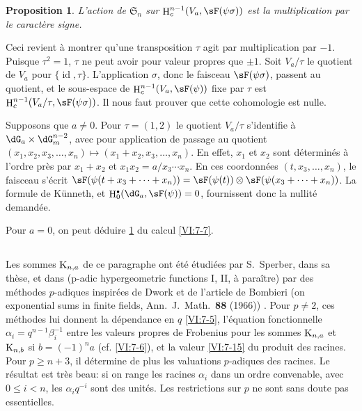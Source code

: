 \documentclass[oneside]{book}
\DeclareMathOperator{\h}{H}
\newcommand{\kloos}{\textnormal{K}} %
\theoremstyle{sga-source}
\theoremstyle{sga-source-dash}
\theoremstyle{sga-source-dotdash}
\theoremstyle{sga-source-number-note-dash}
\theoremstyle{sga-source-note-number-dotdash}
\theoremstyle{sga-source-example-dotdash}
\theoremstyle{sga-source-inline-number}
\theoremstyle{sga-source-bare-number}
\theoremstyle{sga-source}
\newtheorem{proposition_}[subsection]{Proposition}
\let\oldbullet\bullet
\renewcommand{\bullet}{\textnormal{\tiny$\oldbullet$}}
\newcommand{\PrintPage}[1]{}\newcommand{\MathPage}[1]{}\newcommand{\PrintCite}[2]{#1}\newcommand{\var}[3]{#1}
\begin{document}
\begin{proposition_}\label{VI:7-20}
L'action de $\mathfrak{S}_n$ sur $\h_c^{n-1}(V_a,\sF(\psi\sigma))$ est la multiplication 
par le caractère signe. 
\end{proposition_}

Ceci revient à montrer qu'une transposition $\tau$ agit par multiplication 
par $-1$. Puisque $\tau^2=1$, $\tau$ ne peut avoir \var{pour valeur propres}{pour valeurs propres}{S45-SOL-0971} que 
$\pm 1$. Soit $V_a/\tau$ le quotient de $V_a$ pour 
$\{\operatorname{id},\tau\}$. L'application $\sigma$, donc le faisceau 
$\sF(\psi\sigma)$, passent au quotient, et le sous-espace de 
$\h_c^{n-1}(V_a,\sF(\psi))$ fixe par 
$\tau$ est $\h_c^{n-1}(V_a/\tau,\sF(\psi\sigma))$. Il nous faut prouver que 
cette cohomologie est nulle. 

Supposons que $a\ne 0$. Pour $\tau=(1,2)$ le quotient $V_a/\tau$ s'identifie 
à $\dG_a\times \dG_m^{n-2}$, avec pour application de passage au quotient 
$(x_1,x_2,x_3,\dots,x_n)\mapsto (x_1+x_2,x_3,\dots,x_n)$. En effet, $x_1$ et 
$x_2$ sont déterminés \PrintPage{229}
à l'ordre près par $x_1+x_2$ et 
$x_1x_2 = a/x_3\dotsm x_n$. En ces coordonnées $(t,x_3,\dots,x_n)$, le 
faisceau s'écrit 
$\sF(\psi(t+x_3+\cdots + x_n)) = \sF(\psi(t))\otimes \sF(\psi(x_3+\cdots + x_n))$. 
La formule de K\"unneth, et $\var{\h_0^\bullet(\dG_a,\sF(\psi))}{\h_c^\bullet(\dG_a,\sF(\psi))}{S45-SOL-0973} = 0$, fournissent 
donc la nullité demandée. 

Pour $a=0$, on peut déduire \ref{VI:7-20} du calcul \ref{VI:7-7}. 





\subsection{}\label{VI:7-21}

Les sommes $\kloos_{n,a}$ de ce paragraphe ont été étudiées par 
S.\ Sperber, dans sa thèse, et dans (p-adic hypergeometric functions I, II, à paraître) \cite{sp77} par des méthodes 
$p$-adiques inspirées de Dwork et de l'article de Bombieri (on exponential sums in finite fields, Ann.~J.~Math.~\textbf{88} (1966)) \cite{bo66}. 
Pour $p\ne 2$, ces méthodes lui donnent la dépendance en $q$ \ref{VI:7-5}, 
l'équation fonctionnelle $\alpha_i = q^{n-1} \beta_i^{-1}$ entre les 
valeurs propres de Frobenius pour les sommes $\kloos_{n,a}$ et 
$\kloos_{n,b}$ si $b=(-1)^n a$ (cf. \ref{VI:7-6}), et la valeur \ref{VI:7-15} 
du produit des racines. Pour $p\geqslant n+3$, il détermine de plus les 
valuations $p$-adiques des racines. Le résultat est très beau: si on range 
les racines $\alpha_i$ dans un ordre convenable, avec 
$0\leqslant i<n$, les $\alpha_i q^{-i}$ sont des unités. Les 
restrictions sur $p$ ne sont sans doute pas essentielles. 
\end{document}
